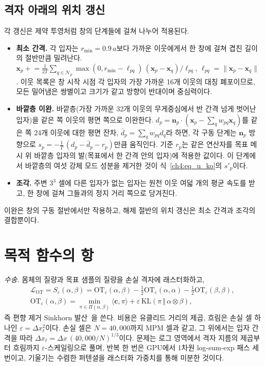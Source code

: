 \subsection{격자 아래의 위치 갱신}
\label{ch4:sec_below_grid_ko}
각 갱신은 제약 투영처럼 창의 단계들에 걸쳐 나누어 적용된다.
\begin{itemize}
  \item \textbf{최소 간격.} 각 입자는 $r_{\min}=0.9\,a$보다 가까운 이웃에게서 한 창에 걸쳐 겹친 길이의 절반만큼 밀려난다.
        $\mathbf{x}_p\mathrel{+}=\tfrac{1}{2T}\sum_{q\in\mathcal{N}_p}\max(0,r_{\min}-\ell_{pq})\,
        (\mathbf{x}_p-\mathbf{x}_q)/\ell_{pq}$, $\ell_{pq}=\lVert\mathbf{x}_p-\mathbf{x}_q\rVert$. 이웃 목록은 창 시작 시점
        각 입자의 가장 가까운 16개 이웃의 대칭 폐포이므로, 모든 밀어냄은 쌍별이고 크기가 같고 방향이 반대이며 중심력이다.
  \item \textbf{바깥층 이완.} 바깥층(가장 가까운 32개 이웃의 무게중심에서 반 간격 넘게 벗어난 입자)을 같은 쪽 이웃의 평면
        쪽으로 이완한다. $d_p=\mathbf{n}_p\cdot(\mathbf{x}_p-\sum_q w_{pq}\mathbf{x}_q)$를 같은 쪽 24개 이웃에 대한 평면 잔차,
        $\bar d_p=\sum_q w_{pq}d_q$라 하면, 각 구동 단계는 $\mathbf{n}_p$ 방향으로 $s_p=-\tfrac{1}{T}\,(d_p-\bar d_p-r_p)$만큼
        움직인다. 기준 $r_p$는 같은 연산자를 목표 메시 위 바깥층 입자의 발(목표에서 한 간격 안의 입자)에 적용한 값이다. 이
        단계에서 바깥층의 여섯 강체 모드 성분을 제거한 것이 식~\eqref{ch4:eq_u_ko}의 $s'_p$이다.
  \item \textbf{조각.} 주변 $3^3$ 셀에 다른 입자가 없는 입자는 원천 이웃 여덟 개의 평균 속도를 받고, 한 창에 걸쳐 그들과의
        정지 거리 쪽으로 당겨진다.
\end{itemize}
이완은 창의 구동 절반에서만 작용하고, 해제 절반의 위치 갱신은 최소 간격과 조각의 결합뿐이다.

\section{목적 함수의 항}
\label{app:ch4_terms_ko}

\textit{수송.} 몸체의 질량과 목표 샘플의 질량을 손실 격자에 래스터화하고,
\begin{equation}
\begin{gathered}
\mathcal{L}_{\mathrm{OT}}=S_\varepsilon(\alpha,\beta)=\mathrm{OT}_\varepsilon(\alpha,\beta)
 -\tfrac12\mathrm{OT}_\varepsilon(\alpha,\alpha)-\tfrac12\mathrm{OT}_\varepsilon(\beta,\beta),\\
\mathrm{OT}_\varepsilon(\alpha,\beta)=\min_{\pi\in\Pi(\alpha,\beta)}\langle\mathbf{c},\pi\rangle
 +\varepsilon\,\mathrm{KL}(\pi\,\Vert\,\alpha\otimes\beta),
\end{gathered}
\end{equation}
즉 편향 제거 Sinkhorn 발산~\citep{feydy2019sinkhorn}을 쓴다. 비용은 유클리드 거리의 제곱, 흐림은 손실 셀 하나인
$\varepsilon=\Delta x_\ell^2$이다. 손실 셀은 $N=40{,}000$까지 MPM 셀과 같고, 그 위에서는 입자 간격을 따라
$\Delta x_\ell=\Delta x\,(40{,}000/N)^{1/3}$이다. 문제는 로그 영역에서 격자 지름의 제곱부터 흐림까지 $\varepsilon$-스케일링으로
풀며, 반복 한 번은 GPU에서 1차원 log-sum-exp 패스 세 번이고, 기울기는 수렴한 퍼텐셜을 래스터화 가중치를 통해 미분한 것이다.

